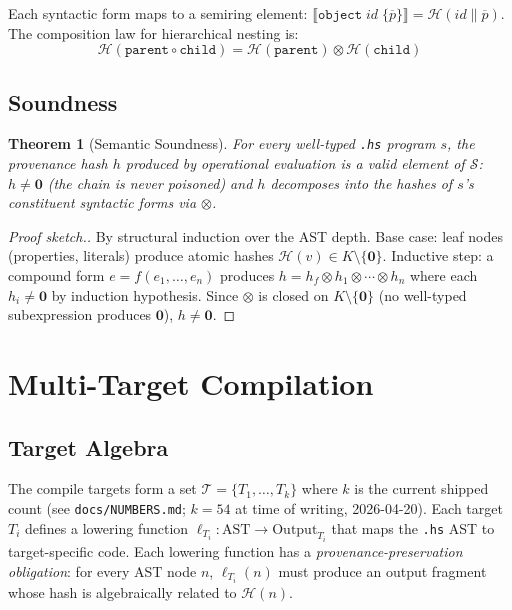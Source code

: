 \documentclass[sigconf,nonacm]{acmart}
\newcommand{\hscore}{\texttt{.hs}}
\newcommand{\hashfn}{\mathcal{H}}
\newcommand{\tropmult}{\otimes}
\newcommand{\provsemiring}{\mathcal{S}}
\newtheorem{theorem}{Theorem}
\begin{document}
Each syntactic form maps to a semiring element:
$\llbracket \texttt{object}\;id\;\{\overline{p}\} \rrbracket
 = \hashfn(\textit{id} \| \overline{p})$. The composition law
for hierarchical nesting is:
$$\hashfn(\texttt{parent} \circ \texttt{child})
  = \hashfn(\texttt{parent}) \tropmult \hashfn(\texttt{child})$$

\subsection{Soundness}
\begin{theorem}[Semantic Soundness]
For every well-typed \hscore{} program $s$, the provenance
hash $h$ produced by operational evaluation is a valid element
of $\provsemiring$: $h \neq \mathbf{0}$ (the chain is never
poisoned) and $h$ decomposes into the hashes of $s$'s
constituent syntactic forms via $\tropmult$.
\end{theorem}

\begin{proof}[Proof sketch.]
By structural induction over the AST depth. Base case:
leaf nodes (properties, literals) produce atomic hashes
$\hashfn(v) \in K \setminus \{\mathbf{0}\}$. Inductive
step: a compound form $e = f(e_1, \ldots, e_n)$ produces
$h = h_f \tropmult h_1 \tropmult \cdots \tropmult h_n$
where each $h_i \neq \mathbf{0}$ by induction hypothesis.
Since $\tropmult$ is closed on $K \setminus \{\mathbf{0}\}$
(no well-typed subexpression produces $\mathbf{0}$),
$h \neq \mathbf{0}$.
\end{proof}

\section{Multi-Target Compilation}
\label{sec:compilation}

\subsection{Target Algebra}

The compile targets form a set $\mathcal{T} = \{T_1, \ldots,
T_k\}$ where $k$ is the current shipped count (see
\texttt{docs/NUMBERS.md}; $k=54$ at time of writing, 2026-04-20).
Each target $T_i$ defines a lowering function
$\ell_{T_i}: \text{AST} \to \text{Output}_{T_i}$ that maps the
\hscore{} AST to target-specific code. Each lowering function
has a \emph{provenance-preservation obligation}: for every AST
node $n$, $\ell_{T_i}(n)$ must produce an output fragment
whose hash is algebraically related to $\hashfn(n)$.
\end{document}
